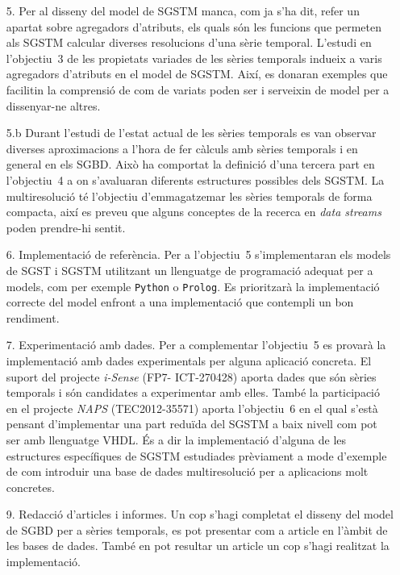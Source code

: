 \begin{itemize}

\item[5.] Per al disseny del model de SGSTM manca, com ja s'ha dit,
  refer un apartat sobre agregadors d'atributs, els quals són les
  funcions que permeten als SGSTM calcular diverses resolucions d'una
  sèrie temporal. L'estudi en l'objectiu~3 de les propietats variades
  de les sèries temporals indueix a varis agregadors d'atributs en el
  model de SGSTM. Així, es donaran exemples que facilitin la
  comprensió de com de variats poden ser i serveixin de model per a
  dissenyar-ne altres.


\item[5.b] Durant l'estudi de l'estat actual de les sèries temporals
  es van observar diverses aproximacions a l'hora de fer càlculs amb
  sèries temporals i en general en els SGBD. Això ha comportat la
  definició d'una tercera part en l'objectiu~4 a on s'avaluaran
  diferents estructures possibles dels SGSTM.  La multiresolució té
  l'objectiu d'emmagatzemar les sèries temporals de forma compacta,
  així es preveu que alguns conceptes de la recerca en \emph{data
    streams} poden prendre-hi sentit.



\item[6.] Implementació de referència. Per a l'objectiu~5 s'implementaran
  els models de SGST i SGSTM utilitzant un llenguatge de programació adequat
  per a models, com per exemple \texttt{Python} o \texttt{Prolog}.  Es
  prioritzarà la implementació correcte del model enfront a una
  implementació que contempli un bon rendiment. 


\item[7.] Experimentació amb dades. Per a complementar l'objectiu~5 es
  provarà la implementació amb dades experimentals per alguna
  aplicació concreta. El suport del projecte \emph{i-Sense} (FP7-
  ICT-270428) aporta dades que són sèries temporals i són candidates a
  experimentar amb elles.  També la participació en el projecte
  \emph{NAPS} (TEC2012-35571) aporta l'objectiu~6 en el qual s'està
  pensant d'implementar una part reduïda del SGSTM a baix nivell com
  pot ser amb llenguatge VHDL. És a dir la implementació d'alguna de
  les estructures específiques de SGSTM estudiades prèviament a mode
  d'exemple de com introduir una base de dades multiresolució per a
  aplicacions molt concretes.




\item[9.] Redacció d'articles i informes. Un cop s'hagi completat el
  disseny del model de SGBD per a sèries temporals, es pot presentar
  com a article en l'àmbit de les bases de dades.  També en pot
  resultar un article un cop s'hagi realitzat la implementació.


\end{itemize}




